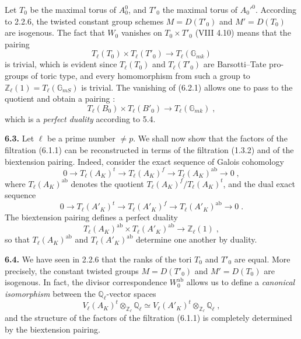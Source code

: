 \documentclass[11pt]{article}
\theoremstyle{plain}
\theoremstyle{definition}
\theoremstyle{remark}
\newcommand{\GG}{\mathbb G}
\newcommand{\QQ}{\mathbb Q}
\newcommand{\ZZ}{\mathbb Z}
\newcommand{\Tl}{T_\ell}
\newcommand{\ab}{\mathrm{ab}}
\begin{document}
Let $T_0$ be the maximal torus of $A_0^0$, and $T'_0$ the maximal torus
of $A_0'^0$. According to 2.2.6, the twisted constant group schemes
$M = D(T'_0)$ and $M' = D(T_0)$ are isogenous. The fact that $W_0$
vanishes on $T_0 \times T'_0$ (VIII 4.10) means that the pairing
\begin{equation}
\Tl(T_0) \times \Tl(T'_0) \longrightarrow \Tl(\GG_{mk})
\end{equation}
is trivial, which is evident since $\Tl(T_0)$ and $\Tl(T'_0)$ are
Barsotti--Tate pro-groups of toric type, and every homomorphism from
such a group to $\ZZ_{\ell}(1) = \Tl(\GG_{mS})$ is trivial. The
vanishing of (6.2.1) allows one to pass to the quotient and obtain a
pairing :
\begin{equation}
\Tl(B_0) \times \Tl(B'_0) \longrightarrow \Tl(\GG_{mk}) \; ,
\end{equation}
which is a \emph{perfect duality} according to 5.4.

\medskip

\noindent\textbf{6.3.} Let $\ell$ be a prime number $\neq p$. We shall
now show that the factors of the filtration (6.1.1) can be
reconstructed in terms of the filtration (1.3.2) and of the biextension
pairing. Indeed, consider the exact sequence of Galois cohomology
\begin{equation}
0 \longrightarrow \Tl(A_K)^t \longrightarrow \Tl(A_K)^f
\longrightarrow \Tl(A_K)^{\ab} \longrightarrow 0 \; ,
\end{equation}
where $\Tl(A_K)^{\ab}$ denotes the quotient
$\Tl(A_K)^f/\Tl(A_K)^t$, and the dual exact sequence
\begin{equation}
0 \longrightarrow \Tl(A'_K)^t \longrightarrow \Tl(A'_K)^f
\longrightarrow \Tl(A'_K)^{\ab} \longrightarrow 0 \; .
\end{equation}
The biextension pairing defines a perfect duality
\begin{equation}
\Tl(A_K)^{\ab} \times \Tl(A'_K)^{\ab} \longrightarrow
\ZZ_{\ell}(1) \; ,
\end{equation}
so that $\Tl(A_K)^{\ab}$ and $\Tl(A'_K)^{\ab}$ determine one another by
duality.

\medskip

\noindent\textbf{6.4.} We have seen in 2.2.6 that the ranks of the tori
$T_0$ and $T'_0$ are equal. More precisely, the constant twisted groups
$M = D(T'_0)$ and $M' = D(T_0)$ are isogenous. In fact, the divisor
correspondence $W_0^{\ab}$ allows us to define a \emph{canonical
isomorphism} between the $\QQ_{\ell}$-vector spaces
\begin{equation}
V_{\ell}(A_K)^t \otimes_{\ZZ_{\ell}} \QQ_{\ell} \simeq
V_{\ell}(A'_K)^t \otimes_{\ZZ_{\ell}} \QQ_{\ell} \; ,
\end{equation}
and the structure of the factors of the filtration (6.1.1) is completely
determined by the biextension pairing.
\end{document}
